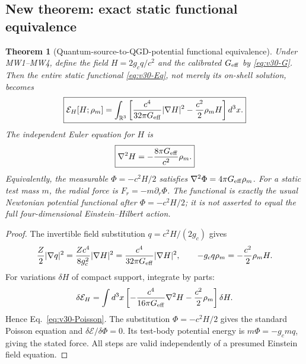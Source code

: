\documentclass[11pt,a4paper]{article}
\newtheorem{theorem}{Theorem}[section]
\theoremstyle{remark}\newtheorem{remark}[theorem]{Remark}
\begin{document}
\subsection{New theorem: exact static functional equivalence}\label{sec:v30-energy}
\begin{theorem}[Quantum-source-to-QGD-potential functional equivalence]\label{thm:v30-functional}
Under MW1--MW4, define the field $H=2g_cq/c^2$ and the calibrated $G_{\rm eff}$ by \eqref{eq:v30-G}. Then the \emph{entire} static functional \eqref{eq:v30-Eq}, not merely its on-shell solution, becomes
\begin{equation}\label{eq:v30-EH}
\boxed{\mathcal E_H[H;\rho_m]
=\int_{\mathbb R^3}\left[\frac{c^4}{32\pi G_{\rm eff}}|\nabla H|^2
-\frac{c^2}{2}\rho_m H\right]d^3x.}
\end{equation}
The independent Euler equation for $H$ is
\begin{equation}\label{eq:v30-Poisson}
\boxed{\nabla^2H=-\frac{8\pi G_{\rm eff}}{c^2}\rho_m.}
\end{equation}
Equivalently, the measurable $\Phi=-c^2H/2$ satisfies $\nabla^2\Phi=4\pi G_{\rm eff}\rho_m$. For a static test mass $m$, the radial force is $F_r=-m\partial_r\Phi$. The functional is exactly the usual Newtonian potential functional after $\Phi=-c^2H/2$; it is \emph{not} asserted to equal the full four-dimensional Einstein--Hilbert action.
\end{theorem}
\begin{proof}
The invertible field substitution $q=c^2H/(2g_c)$ gives
\[
\frac Z2|\nabla q|^2=\frac{Zc^4}{8g_c^2}|\nabla H|^2
=\frac{c^4}{32\pi G_{\rm eff}}|\nabla H|^2,
\qquad -g_cq\rho_m=-\frac{c^2}{2}\rho_mH.
\]
For variations $\delta H$ of compact support, integrate by parts:
\[
\delta\mathcal E_H=\int d^3x\left[-\frac{c^4}{16\pi G_{\rm eff}}\nabla^2H-\frac{c^2}{2}\rho_m\right]\delta H.
\]
Hence Eq.~\eqref{eq:v30-Poisson}. The substitution $\Phi=-c^2H/2$ gives the standard Poisson equation and $\delta\mathcal E/\delta\Phi=0$. Its test-body potential energy is $m\Phi=-g_cmq$, giving the stated force. All steps are valid independently of a presumed Einstein field equation.\end{proof}
\end{document}

